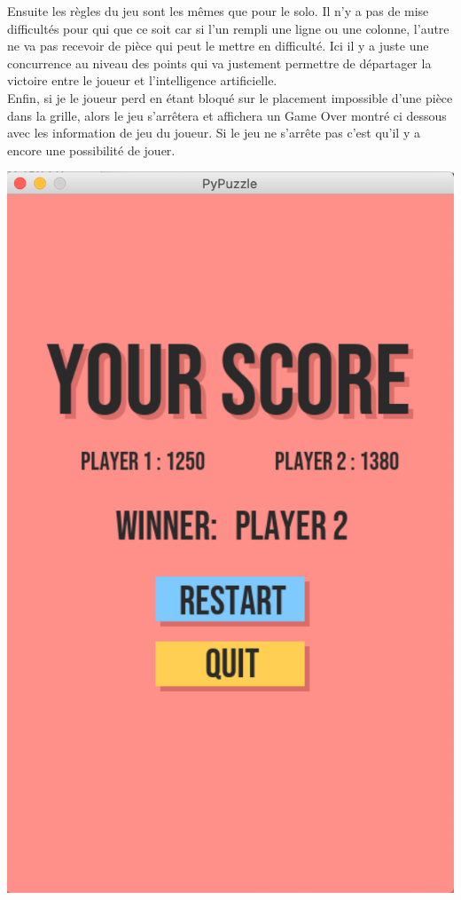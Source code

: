 \documentclass[]{report}
\begin{document}
Ensuite les règles du jeu sont les mêmes que pour le solo. Il n'y a pas de mise difficultés pour qui que ce soit car si l'un rempli une ligne ou une colonne, l'autre ne va pas recevoir de pièce qui peut le mettre en difficulté. Ici il y a juste une concurrence au niveau des points qui va justement permettre de départager la victoire entre le joueur et l'intelligence artificielle.\\

Enfin, si je le joueur perd en étant bloqué sur le placement impossible d'une pièce dans la grille, alors le jeu s'arrêtera et affichera un Game Over montré ci dessous avec les information de jeu du joueur. Si le jeu ne s'arrête pas c'est qu'il y a encore une possibilité de jouer.  \\
\begin{center}
\includegraphics[scale=0.2]{images/GOmulti.png}\\
\end{center}
\end{document}
